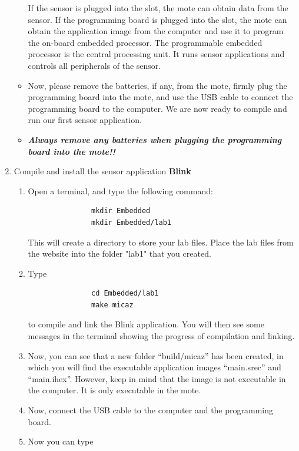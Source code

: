 \documentclass[letterpaper,12pt]{article}
\begin{document}
\begin{enumerate}
\begin{itemize}
               If the sensor is plugged into the slot, the mote can obtain data from the
               sensor. If the programming board is plugged into the slot, the mote can
               obtain the application image from the computer and use it to program the on-board
               embedded processor. The programmable embedded processor is the central
               processing unit. It runs sensor applications and controls all peripherals
               of the sensor.
         \item Now, please remove the batteries, if any, from the mote, firmly plug the programming
               board into the mote, and use the USB cable to connect the programming board
               to the computer. We are now ready to compile and run our first sensor application.
         \item \emph{\textbf{Always remove any batteries when plugging the programming board into the mote!!}}
      \end{itemize}
   \item Compile and install the sensor application \textbf{Blink}
      \begin{enumerate}
         \item Open a terminal, and type the following command:
               \begin{lstlisting}
               mkdir Embedded
               mkdir Embedded/lab1
               \end{lstlisting}
               This will create a directory to store your lab files. Place the lab files from the website
               into the folder "lab1" that you created.
         \item Type 
               \begin{lstlisting}
               cd Embedded/lab1
               make micaz
               \end{lstlisting}
               to compile and link the Blink application. You will then see some messages in
               the terminal showing the progress of compilation and linking.
         \item Now, you can see that a new folder “build/micaz” has been created, in
               which you will find the executable application images “main.srec” and “main.ihex”.
               However, keep in mind that the image is not executable in the computer.
               It is only executable in the mote.
         \item Now, connect the USB cable to the computer and the programming board.
         \item Now you can type

\end{enumerate}
\end{enumerate}
\end{document}
